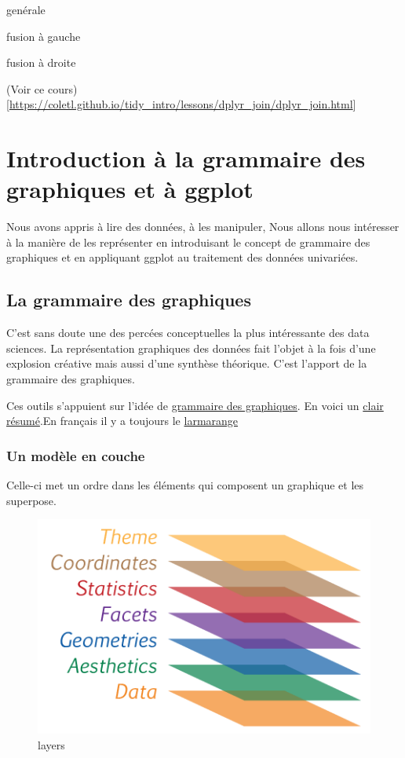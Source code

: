 \documentclass[
]{book}
\begin{document}
genérale

fusion à gauche

fusion à droite

(Voir ce cours){[}\url{https://coletl.github.io/tidy_intro/lessons/dplyr_join/dplyr_join.html}{]}

\hypertarget{introduction-uxe0-la-grammaire-des-graphiques-et-uxe0-ggplot}{%
\chapter{Introduction à la grammaire des graphiques et à ggplot}\label{introduction-uxe0-la-grammaire-des-graphiques-et-uxe0-ggplot}}

Nous avons appris à lire des données, à les manipuler, Nous allons nous intéresser à la manière de les représenter en introduisant le concept de grammaire des graphiques et en appliquant ggplot au traitement des données univariées.

\hypertarget{la-grammaire-des-graphiques}{%
\section{La grammaire des graphiques}\label{la-grammaire-des-graphiques}}

C'est sans doute une des percées conceptuelles la plus intéressante des data sciences. La représentation graphiques des données fait l'objet à la fois d'une explosion créative mais aussi d'une synthèse théorique. C'est l'apport de la grammaire des graphiques.

Ces outils s'appuient sur l'idée de \href{https://www.goodreads.com/book/show/2549408.The_Grammar_of_Graphics}{grammaire des graphiques}. En voici un \href{https://cfss.uchicago.edu/notes/grammar-of-graphics/}{clair résumé}.En français il y a toujours le \href{http://larmarange.github.io/analyse-R/intro-ggplot2.html}{larmarange}

\hypertarget{un-moduxe8le-en-couche}{%
\subsection{Un modèle en couche}\label{un-moduxe8le-en-couche}}

Celle-ci met un ordre dans les éléments qui composent un graphique et les superpose.

\begin{figure}
\centering
\includegraphics{./Images/graphiclayers.png}
\caption{layers}
\end{figure}
\end{document}

